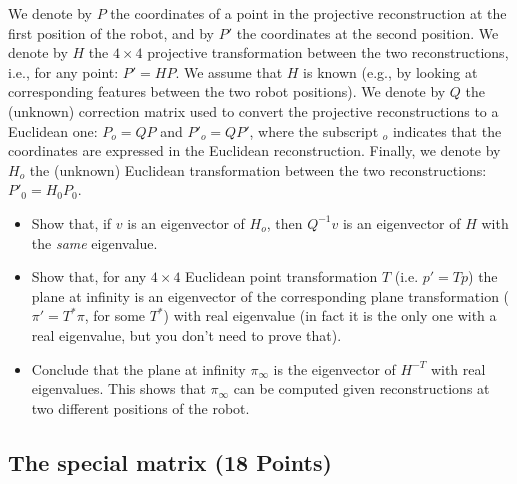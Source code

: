 \documentclass[11pt]{article}
\begin{document}
We denote by $P$ the coordinates of a point in the projective reconstruction at the first position of the robot, and 
by $P'$ the coordinates at the second position. We denote by $H$ the $4 \times 4$ projective transformation between the 
two reconstructions, i.e., for any point: $P' = HP$. We assume that $H$ is known (e.g., by looking at corresponding features 
between the two robot positions). We denote by $Q$ the (unknown) correction matrix used to convert the projective 
reconstructions to a Euclidean one: $P_o = QP$ and $P'_o = QP'$, where the subscript $_o$ indicates that the coordinates
are expressed in the Euclidean reconstruction. Finally, we denote by $H_o$ the (unknown) Euclidean transformation 
between the two reconstructions: $P'_0=H_0P_0$.

\begin{itemize}

\item Show that, if $v$ is an eigenvector of $H_o$, then $Q^{-1}v$ is an eigenvector of $H$ with the {\em same} eigenvalue.
\item Show that, for any $4 \times 4$ Euclidean point transformation $T$ (i.e. $p' = Tp$) the plane at infinity is an eigenvector of 
the corresponding plane transformation ($\pi' = T^*\pi$, for some $T^*$) with real eigenvalue
 (in fact it is the only one with a real eigenvalue, but you don't need to prove that).
\item Conclude that the plane at infinity $\pi_\infty$ is the eigenvector of $H^{-T}$ with real eigenvalues.
This shows that $\pi_\infty$ can be computed given reconstructions at two different positions of the robot.

\end{itemize}

\subsection{The special matrix (18 Points)}
\end{document}
